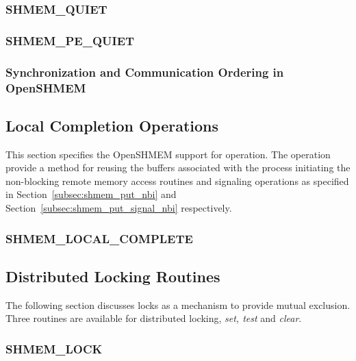 \documentclass[10pt,oneside]{book}
\begin{document}
\subsubsection{\textbf{SHMEM\_QUIET}}\label{subsec:shmem_quiet}


\subsubsection{\textbf{SHMEM\_PE\_QUIET}}\label{subsec:shmem_pe_quiet}


\subsubsection{Synchronization and Communication Ordering in OpenSHMEM}



\color{teal}
\subsection{Local Completion Operations}\label{sec:lcomplete}
This section specifies the OpenSHMEM support for  
operation. The  operation provide a method for reusing 
the  buffers associated with the process initiating the 
non-blocking remote memory access routines and signaling operations as 
specified in Section~\ref{subsec:shmem_put_nbi} and
Section~\ref{subsec:shmem_put_signal_nbi} respectively. 

\subsubsection{\textbf{SHMEM\_LOCAL\_COMPLETE}}\label{subsec:shmem_local_complete}

\color{black}

\subsection{Distributed Locking Routines}
The following section discusses \openshmem locks as a mechanism to provide
mutual exclusion. Three routines are available for distributed locking,
\textit{set, test} and \textit{clear}.

\subsubsection{\textbf{SHMEM\_LOCK}}\label{subsec:shmem_lock}

\end{document}
